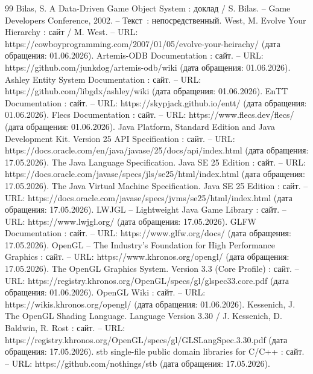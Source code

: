 \begin{thebibliography}{99}
	 Bilas, S. A Data-Driven Game Object System : доклад / S. Bilas. -- Game Developers Conference, 2002. -- Текст~: непосредственный.
	 West, M. Evolve Your Hierarchy : сайт / M. West. -- URL: https://cowboyprogramming.com/2007/01/05/evolve-your-heirachy/ (дата обращения: 01.06.2026).
	 Artemis-ODB Documentation : сайт. -- URL: https://github.com/junkdog/artemis-odb/wiki (дата обращения: 01.06.2026).
	 Ashley Entity System Documentation : сайт. -- URL: https://github.com/libgdx/ashley/wiki (дата обращения: 01.06.2026).
	 EnTT Documentation : сайт. -- URL: https://skypjack.github.io/entt/ (дата обращения: 01.06.2026).
	 Flecs Documentation : сайт. -- URL: https://www.flecs.dev/flecs/ (дата обращения: 01.06.2026).
	 Java Platform, Standard Edition and Java Development Kit. Version 25 API Specification : сайт. -- URL: https://docs.oracle.com/en/java/javase/25/docs/api/\allowbreak index.html (дата обращения: 17.05.2026).
	 The Java Language Specification. Java SE 25 Edition : сайт. -- URL: https://docs.oracle.com/javase/specs/jls/se25/html/\allowbreak index.html (дата обращения: 17.05.2026).
	 The Java Virtual Machine Specification. Java SE 25 Edition : сайт. -- URL: https://docs.oracle.com/javase/specs/jvms/se25/html/\allowbreak index.html (дата обращения: 17.05.2026).
	 LWJGL -- Lightweight Java Game Library : сайт. -- URL: https://www.lwjgl.org/ (дата обращения: 17.05.2026).
	 GLFW Documentation : сайт. -- URL: https://www.glfw.org/docs/ (дата обращения: 17.05.2026).
	 OpenGL -- The Industry's Foundation for High Performance Graphics : сайт. -- URL: https://www.khronos.org/opengl/ (дата обращения: 17.05.2026).
	 The OpenGL Graphics System. Version 3.3 (Core Profile) : сайт. -- URL: https://registry.khronos.org/OpenGL/specs/gl/\allowbreak glspec33.core.pdf (дата обращения: 01.06.2026).
	 OpenGL Wiki : сайт. -- URL: https://wikis.khronos.org/opengl/ (дата обращения: 01.06.2026).
	 Kessenich, J. The OpenGL Shading Language. Language Version 3.30 / J. Kessenich, D. Baldwin, R. Rost : сайт. -- URL: https://registry.khronos.org/OpenGL/specs/gl/\allowbreak GLSLangSpec.3.30.pdf (дата обращения: 17.05.2026).
	 stb single-file public domain libraries for C/C++ : сайт. -- URL: https://github.com/nothings/stb (дата обращения: 17.05.2026).

\end{thebibliography}
